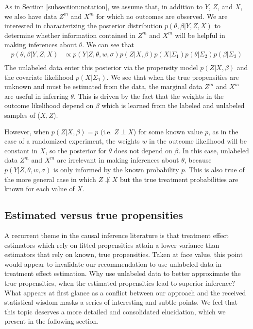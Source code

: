 \documentclass[aos]{imsart}
\begin{document}
As in Section \ref{subsection:notation}, we assume that, in addition to $Y$, $Z$, and $X$, we also have data $Z^m$ and $X^m$ for which no outcomes are observed. 
We are interested in characterizing the posterior distribution $p(\theta, \beta | Y, Z, X)$ to determine whether information contained in $Z^m$ and $X^m$ will be helpful 
in making inferences about $\theta$. We can see that 
\begin{equation*}
\begin{aligned}
p(\theta, \beta | Y, Z, X) & \propto p(Y | Z, \theta, w, \sigma) p(Z | X, \beta) p(X | \Sigma_1) p(\theta | \Sigma_2) p(\beta | \Sigma_3)\\
\end{aligned}
\end{equation*}
The unlabeled data enter this posterior via the propensity model $p(Z | X, \beta)$ and the covariate likelihood $p(X | \Sigma_1)$.
We see that when the true propensities are unknown and must be estimated from the data, the marginal data $Z^m$ and $X^m$ are useful in inferring $\theta$. 
This is driven by the fact that the weights in the outcome likelihood depend on $\beta$ which is learned from the labeled and unlabeled samples of ($X, Z$).

However, when $p(Z | X, \beta) = p$ (i.e. $Z \perp X$) for some known value $p$, as in the case of a randomized experiment, the weights $w$ in the outcome 
likelihood will be constant in $X$, so the posterior for $\theta$ does not depend on $\beta$.
In this case, unlabeled data $Z^m$ and $X^m$ are irrelevant in making inferences about $\theta$, because $p(Y | Z, \theta, w, \sigma)$ is only informed by the known 
probability $p$. This is also true of the more general case in which $Z \not\perp X$ but the true treatment probabilities are known for each value of $X$.

\subsection{Estimated versus true propensities}
\label{subsection:estimatedprop}

A recurrent theme in the causal inference literature is that treatment effect estimators which rely on fitted propensities attain a lower variance than estimators that 
rely on known, true propensities. Taken at face value, this point would appear to invalidate our recommendation to use unlabeled data in treatment effect estimation. 
Why use unlabeled data to better approximate the true propensities, when the estimated propensities lead to superior inference? 
What appears at first glance as a conflict between our approach and the received statistical wisdom masks a series of interesting and subtle points. We feel that this topic 
deserves a more detailed and consolidated elucidation, which we present in the following section.
\end{document}
